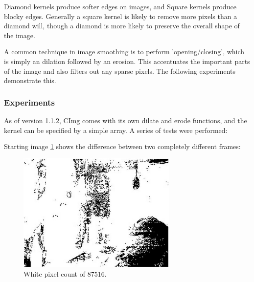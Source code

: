 \documentclass[11pt]{article} %
\begin{document}
{{Diamond kernels produce softer edges on images, and Square kernels produce blocky edges. Generally a square kernel is likely to remove more pixels than a diamond will, though a diamond is more likely to preserve the overall shape of the image.

A common technique in image smoothing is to perform 'opening/closing', which is simply an dilation followed by an erosion. This accentuates the important parts of the image and also filters out any sparse pixels. The following experiments demonstrate this.

\subsubsection{Experiments}
As of version 1.1.2, CImg comes with its own dilate and erode functions, and the kernel can be specified by a simple array. A series of tests were performed:

Starting image \cref{img:uneditsub1} shows the difference between two  completely different frames:
\begin{figure}[H]
	\vspace{50pt}
	\centering
	\includegraphics[width=0.7\textwidth]{../images/ImageOps/uneditedsub}
	\caption{White pixel count of 87516.}
	\label{img:uneditsub1}
\end{figure}

}}
\end{document}
